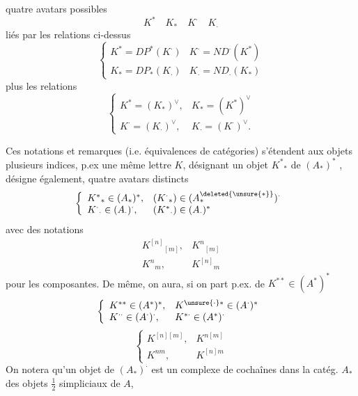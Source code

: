 quatre avatars possibles
\[
 K^*\quad K_*\quad K^{\cdot}\quad K_{\cdot}
\]
liés par les relations ci-dessus
\[
 \left\{\begin{array}{ll}
 K^*=DP^*(K^{\cdot})&K^{\cdot}=ND^{\cdot}(K^*)\\
 K_*=DP_*(K_{\cdot})&K_{\cdot}=ND_{\cdot}(K_*)
 \end{array}\right.
\]
plus les relations
\[
 \left\{\begin{array}{ll}
 K^*=(K_*)^\vee,&K_*=(K^*)^\vee\\
 K^{\cdot}=(K_{\cdot})^\vee,&K_{\cdot}=(K^{\cdot})^\vee.
 \end{array}\right.
\]

Ces  notations et remarques (i.e. équivalences de
catégories) s'étendent aux objets 
 plusieurs indices, p.ex 
une même lettre $K$, désignant 
un objet ${K^*}_*$ de $(A_*)^*$ , désigne également,
 quatre avatars distincts
\[
 \left\{\begin{array}{ll}
 {K^*}_*\in(A_*)^*,&({K^{\cdot}}_*)\in(A^{\deleted{\unsure{*}}}_*)^{\cdot}\\
 {K^{\cdot}}_{\cdot}\in(A_{\cdot})^{\cdot},&({K^*}_{\cdot})\in(A_{\cdot})^*
 \end{array}\right.
\]
avec des notations
\[
 \begin{array}{ll}
 {K^{[n]}}_{[m]},&{K^n}_{[m]}\\
 {K^n}_m,&{K^{[n]}}_m
 \end{array}
\]
pour les composantes. De même, on aura, si on part p.ex. de
$K^{**}\in(A^*)^*$
\[
 \left\{\begin{array}{ll}
 K^{**}\in(A^*)^*,&K^{\unsure{\cdot}*}\in(A^{\cdot})^*\\
 K^{\cdot\cdot}\in(A^{\cdot})^{\cdot},&K^{*\cdot}\in(A^*)^{\cdot}
 \end{array}\right.
\]
\[
 \left\{\begin{array}{ll}
 K^{[n][m]},&K^{n[m]}\\
 K^{nm},&K^{[n]m}
 \end{array}\right.
\]
On notera qu'un objet de $(A_*)^{\cdot}$ est un complexe de cochaînes
dans la catég. $A_*$ des objets $\tfrac12$ simpliciaux de $A$,
